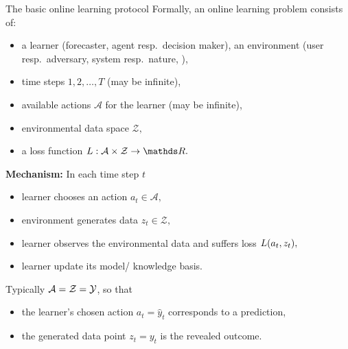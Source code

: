 \begin{frame}{The basic online learning protocol}
	\footnotesize
	Formally, an online learning problem consists of:
	\begin{itemize}\footnotesize
		 \item a learner (forecaster, agent resp.\ decision maker), an environment (user resp.\ adversary, system resp.\ nature, ),
		 \item time steps $1,2,\ldots,T$ (may be infinite),
		 \item available actions $\mathcal A$ for the learner (may be infinite),
		 \item environmental data space $\mathcal Z,$
		 \item a loss function $\l: \mathcal{A} \times \mathcal{Z} \to \R.$
	\end{itemize}
	{ {\textbf{Mechanism:} In each time step $t$
	\begin{itemize}\footnotesize
		 \item learner chooses an action $a_{t} \in \mathcal{A},$
		 \item environment generates data $z_{t} \in \mathcal{Z},$
		 \item learner observes the environmental data and suffers loss $L(a_{t},z_{t}),$ 
		 \item learner update its model/ knowledge basis.
	\end{itemize}}}
	{ {	Typically $\mathcal{A} = \mathcal{Z} = \mathcal{Y}$, so that
	\begin{itemize}\footnotesize
		\item the learner's chosen action $a_{t} = \hat{y}_t$ corresponds to a prediction,
		\item the generated data point $z_{t} =y_t$ is the revealed outcome.
	\end{itemize}}}
\end{frame}

